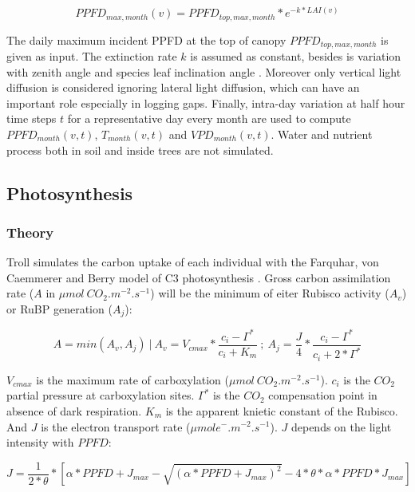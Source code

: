 \documentclass[12pt,]{article}
\theoremstyle{definition}
\theoremstyle{definition}
\theoremstyle{remark}
\begin{document}
\begin{equation}
  PPFD_{max,month}(v) = PPFD_{top,max,month}*e^{-k*LAI(v)}
  \label{eq:PPFD}
\end{equation}

The daily maximum incident PPFD at the top of canopy
\(PPFD_{top,max,month}\) is given as input. The extinction rate \(k\) is
assumed as constant, besides is variation with zenith angle and species
leaf inclination angle \citep{Meir2000}. Moreover only vertical light
diffusion is considered ignoring lateral light diffusion, which can have
an important role especially in logging gaps. Finally, intra-day
variation at half hour time steps \(t\) for a representative day every
month are used to compute \(PPFD_{month}(v,t)\), \(T_{month}(v,t)\) and
\(VPD_{month}(v,t)\). Water and nutrient process both in soil and inside
trees are not simulated.

\subsection{Photosynthesis}\label{photosynthesis}

\subsubsection{Theory}\label{theory}

Troll simulates the carbon uptake of each individual with the Farquhar,
von Caemmerer and Berry model of C3 photosynthesis \citep{Farquhar1980}.
Gross carbon assimilation rate (\(A\) in
\(\mu mol~CO_2. m^{-2}.s^{-1}\)) will be the minimum of eiter Rubisco
activity (\(A_v\)) or RuBP generation (\(A_j\)):

\begin{equation}
  A=min(A_v, A_j)~|~A_v=V_{cmax}*\frac{c_i-\Gamma^*}{c_i+K_m}~;~A_j=\frac{J}{4}*\frac{c_i-\Gamma^*}{c_i+2*\Gamma^*}
  \label{eq:A}
\end{equation}

\(V_{cmax}\) is the maximum rate of carboxylation
(\(\mu mol~CO_2.m^{-2}.s^{-1}\)). \(c_i\) is the \(CO_2\) partial
pressure at carboxylation sites. \(\Gamma^*\) is the \(CO_2\)
compensation point in absence of dark respiration. \(K_m\) is the
apparent knietic constant of the Rubisco. And \(J\) is the electron
transport rate (\(\mu mol e^-.m^{-2}.s^{-1}\)). \(J\) depends on the
light intensity with \(PPFD\):

\begin{equation}
  J = \frac{1}{2*\theta}*[\alpha*PPFD+J_{max}-\sqrt{(\alpha*PPFD+J_{max})^2}-4*\theta*\alpha*PPFD*J_{max}]
  \label{eq:J}
\end{equation}
\end{document}
